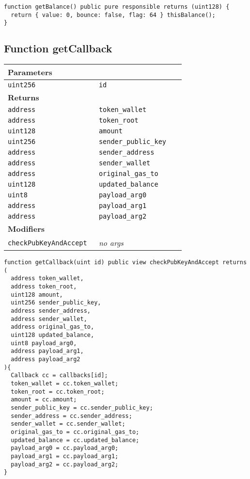 \vspace{2cm}

\begin{lstlisting}[firstnumber=604]
function getBalance() public pure responsible returns (uint128) {
  return { value: 0, bounce: false, flag: 64 } thisBalance();
}
\end{lstlisting}

\subsection{Function getCallback}


\ifsoltables
\noindent\begin{tabular}{|l|l|p{5cm}|}\hline
\multicolumn{3}{|l|}{\bf Parameters}\\\hline
\tt uint256 & \tt id &\\\hline
\multicolumn{3}{|l|}{\bf Returns}\\\hline
\tt address & \tt token\_{}wallet &\\\hline
\tt address & \tt token\_{}root &\\\hline
\tt uint128 & \tt amount &\\\hline
\tt uint256 & \tt sender\_{}public\_{}key &\\\hline
\tt address & \tt sender\_{}address &\\\hline
\tt address & \tt sender\_{}wallet &\\\hline
\tt address & \tt original\_{}gas\_{}to &\\\hline
\tt uint128 & \tt updated\_{}balance &\\\hline
\tt uint8 & \tt payload\_{}arg0 &\\\hline
\tt address & \tt payload\_{}arg1 &\\\hline
\tt address & \tt payload\_{}arg2 &\\\hline
\multicolumn{3}{|l|}{\bf Modifiers}\\\hline
\tt checkPubKeyAndAccept & {\em no args} &\\\hline
\end{tabular}
\fi

\vspace{2cm}

\begin{lstlisting}[firstnumber=571]
function getCallback(uint id) public view checkPubKeyAndAccept returns (
  address token_wallet,
  address token_root,
  uint128 amount,
  uint256 sender_public_key,
  address sender_address,
  address sender_wallet,
  address original_gas_to,
  uint128 updated_balance,
  uint8 payload_arg0,
  address payload_arg1,
  address payload_arg2
){
  Callback cc = callbacks[id];
  token_wallet = cc.token_wallet;
  token_root = cc.token_root;
  amount = cc.amount;
  sender_public_key = cc.sender_public_key;
  sender_address = cc.sender_address;
  sender_wallet = cc.sender_wallet;
  original_gas_to = cc.original_gas_to;
  updated_balance = cc.updated_balance;
  payload_arg0 = cc.payload_arg0;
  payload_arg1 = cc.payload_arg1;
  payload_arg2 = cc.payload_arg2;
}
\end{lstlisting}

